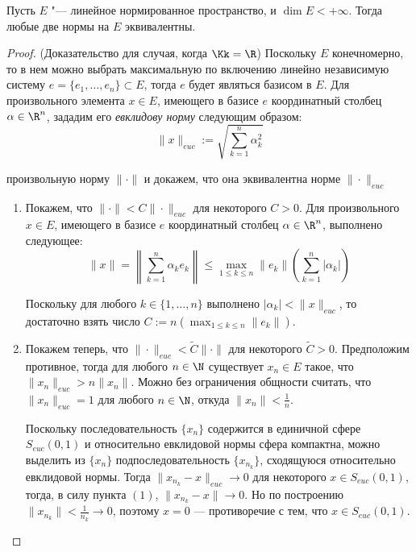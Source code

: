 \begin{proposition}\label{normequiv}
	Пусть $E$ "--- линейное нормированное пространство, и $\dim E < +\infty$. Тогда любые две нормы на $E$ эквивалентны.
\end{proposition}

\begin{proof}(Доказательство для случая, когда {$\Kk = \R$})
	Поскольку $E$ конечномерно, то в нем можно выбрать максимальную по включению линейно независимую систему $e = \{e_1, \dotsc, e_n\} \subset E$, тогда $e$ будет являться базисом в $E$. Для произвольного элемента $x \in E$, имеющего в базисе $e$ координатный столбец $\alpha \in \R^n$, зададим его \textit{евклидову норму} следующим образом:
	\[\|x\|_{euc} := \sqrt{\sum_{k = 1}^n \alpha_k^2}\]

	 произвольную норму $\|\cdot\|$ и докажем, что она эквивалентна норме $\|\cdot\|_{euc}$
	\begin{enumerate}
		\item Покажем, что $\|\cdot\| < C \|\cdot\|_{euc}$ для некоторого $C > 0$. Для произвольного $x \in E$, имеющего в базисе $e$ координатный столбец $\alpha \in \R^n$, выполнено следующее:
		\[\|x\| = \left\|\sum_{k = 1}^n\alpha_k e_k \right\| \leqslant \max_{1 \leqslant k \leqslant n}\|e_k\|\left(\sum_{k = 1}^n|\alpha_k|\right)\]
  
		Поскольку для любого $k \in \{1, \dotsc, n\}$ выполнено $|\alpha_k| < \|x\|_{euc}$, то достаточно взять число $C := n(\max_{1 \leqslant k \leqslant n}\|e_k\|)$.

		\item Покажем теперь, что $\|\cdot\|_{euc} < \widetilde C \|\cdot\|$ для некоторого $\widetilde C > 0$. Предположим противное, тогда для любого $n \in \N$ существует $x_n \in E$ такое, что $\|x_n\|_{euc} > n\|x_n\|$. Можно без ограничения общности считать, что $\|x_n\|_{euc} = 1$ для любого $n \in \N$, откуда $\|x_n\| < \frac 1n$.
		
		Поскольку последовательность $\{x_n\}$ содержится в единичной сфере $S_{euc}(0, 1)$ и относительно евклидовой нормы сфера компактна, можно выделить из $\{x_n\}$ подпоследовательность $\{x_{n_k}\}$, сходящуюся относительно евклидовой нормы. Тогда $\|x_{n_k} - x\|_{euc} \to 0$ для некоторого $x \in S_{euc}(0, 1)$, тогда, в силу пункта $(1)$, $\|x_{n_k} - x\| \to 0$. Но по построению $\|x_{n_k}\| < \frac 1{n_k}\to 0$, поэтому $x = 0$ --- противоречие с тем, что $x \in S_{euc}(0, 1)$.\qedhere
	\end{enumerate}
\end{proof}

